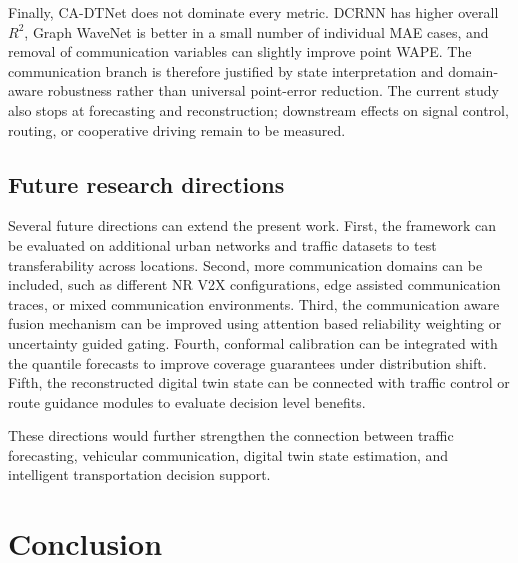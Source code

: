 \documentclass[pdflatex,sn-mathphys-num]{sn-jnl}%
\newenvironment{changed}{}{}
\theoremstyle{thmstyleone}%
\theoremstyle{thmstyletwo}%
\theoremstyle{thmstylethree}%
\begin{document}
\begin{changed}
Finally, CA-DTNet does not dominate every metric. DCRNN has higher overall \(R^{2}\), Graph WaveNet is better in a small number of individual MAE cases, and removal of communication variables can slightly improve point WAPE. The communication branch is therefore justified by state interpretation and domain-aware robustness rather than universal point-error reduction. The current study also stops at forecasting and reconstruction; downstream effects on signal control, routing, or cooperative driving remain to be measured.
\end{changed}

\subsection{Future research directions}
\label{subsec:discussion_future_work}

Several future directions can extend the present work. First, the framework can be evaluated on additional urban networks and traffic datasets to test transferability across locations. Second, more communication domains can be included, such as different NR V2X configurations, edge assisted communication traces, or mixed communication environments. Third, the communication aware fusion mechanism can be improved using attention based reliability weighting or uncertainty guided gating. Fourth, conformal calibration can be integrated with the quantile forecasts to improve coverage guarantees under distribution shift. Fifth, the reconstructed digital twin state can be connected with traffic control or route guidance modules to evaluate decision level benefits.

These directions would further strengthen the connection between traffic forecasting, vehicular communication, digital twin state estimation, and intelligent transportation decision support.

\section{Conclusion}
\label{sec:conclusion}
\end{document}

